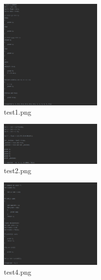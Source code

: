 \documentclass{article}
\begin{document}
					\begin{multicols}{2}
			
			
				\begin{figure}[H]
					\centering
			 			\includegraphics[width=0.45\textwidth]{test1.png}
			 			\centering
			  			\caption{test1.png}
			  			\label{fig:test1}
					\end{figure}
					
			\begin{figure}[H]
					\centering
			 			\includegraphics[width=0.45\textwidth]{test2.png}
			 			\centering
			  			\caption{test2.png}
			  			\label{fig:test2}
					\end{figure}
					
										
					\begin{figure}[H]
					\centering
			 			\includegraphics[width=0.45\textwidth]{test4.png}
			 			\centering
			  			\caption{test4.png}
			  			\label{fig:test4}
					\end{figure}
					

\end{multicols}
\end{document}
